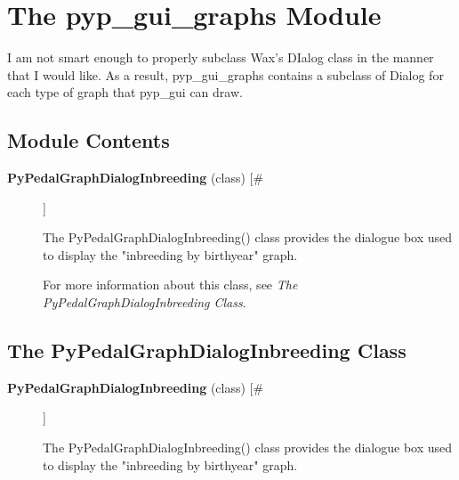\documentclass{article}
\begin{document}
\section*{The pyp\_gui\_graphs Module}
\par I am not smart enough to properly subclass Wax's DIalog class in the manner that
I would like.  As a result, pyp\_gui\_graphs contains a subclass of Dialog for each
type of graph that pyp\_gui can draw.
\subsection*{Module Contents}
\begin{description}
\item[\textbf{PyPedalGraphDialogInbreeding} (class)  [\#]
]
\par The PyPedalGraphDialogInbreeding() class provides the dialogue box used
to display the "inbreeding by birthyear" graph.
\par For more information about this class, see \textit{The PyPedalGraphDialogInbreeding Class}.

\end{description}
\subsection*{The PyPedalGraphDialogInbreeding Class}
\begin{description}
\item[\textbf{PyPedalGraphDialogInbreeding} (class)  [\#]
]
\par The PyPedalGraphDialogInbreeding() class provides the dialogue box used
to display the "inbreeding by birthyear" graph.

\end{description}
\end{document}
